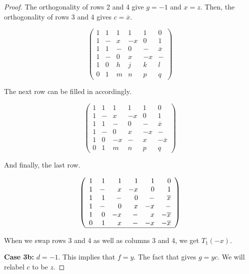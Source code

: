 \begin{lemma}
\begin{proof}
The orthogonality of rows 2 and 4 give $g = -1$ and $x = z$. Then, the orthogonality of rows 3 and 4 gives $c = \overline{x}$.

\begin{equation} \label{mat:3a-3}
\left(\begin{array}{rrrrrr}
 1 &  1 & 1 & 1 & 1 & 0 \\
 1 &  - & x & -x & 0 & 1 \\ 
 1 &  1 & - & 0 & - & \overline{x} \\
 1 &  - & 0 & x & -x & - \\ \hline
 1 &  0 & h & j & k & l \\
 0 &  1 & m & n & p & q
\end{array}\right)
\end{equation}

The next row can be filled in accordingly.

\begin{equation} \label{mat:3a-4}
\left(\begin{array}{rrrrrr}
 1 &  1 & 1 & 1 & 1 & 0 \\
 1 &  - & x & -x & 0 & 1 \\ 
 1 &  1 & - & 0 & - & \overline{x} \\
 1 &  - & 0 & x & -x & - \\
 1 &  0 & -x & - & x & -\overline{x} \\ \hline
 0 &  1 & m & n & p & q
\end{array}\right)
\end{equation}

And finally, the last row.

\begin{equation} \label{mat:3a-5}
\left(\begin{array}{rrrrrr}
 1 &  1 & 1 & 1 & 1 & 0 \\
 1 &  - & x & -x & 0 & 1 \\ 
 1 &  1 & - & 0 & - & \overline{x} \\
 1 &  - & 0 & x & -x & - \\
 1 &  0 & -x & - & x & -\overline{x} \\
 0 &  1 & x & - & -x & -\overline{x} \\ \hline
\end{array}\right)
\end{equation}

When we swap rows 3 and 4 as well as columns 3 and 4, we get $T_1(-x)$.

{\bf Case 3b:} $d = -1$. This implies that $f = y$. The fact that  gives $g = yc$. We will relabel $c$ to be $z$.


\end{proof}
\end{lemma}
